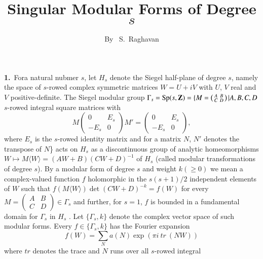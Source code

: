 \title{Singular Modular Forms of Degree $s$}\label{art02}

\author{By~ S.~Raghavan}

\date{}
\maketitle

\setcounter{page}{307}
\setcounter{pageoriginal}{262}
{\bf 1.}~For\pageoriginale a natural nubmer $s$, let $H_{s}$ denote
the Siegel half-plane of degree $s$, namely the space of $s$-rowed
complex symmetric matrices $W=U+iV$ with $U$, $V$ real and $V$
positive-definite. The Siegel modular group
$
\Gamma_{s}=\operatorname{Sp}(s,\mathbf{Z})=\{M=\left(\begin{smallmatrix} A & B\\ C &
D\end{smallmatrix}\right)|A,B,C,D$ $s$-rowed integral square matrices with 
$$
M
\left(
\begin{array}{cc}
0 & E_s\\
-E_s & 0
\end{array}
\right)
M'
=
\left(
\begin{array}{cc}
0 & E_s\\
-E_s & 0
\end{array}
\right),
$$
where $E_s$ is the $s$-rowed identity matrix and for a
matrix $N$, $N'$ denotes the transpose of $N$\} acts on $H_{s}$ as a
discontinuous group of analytic homeomorphisms $W\mapsto M\langle
W\rangle =(AW+B)(CW+D)^{-1}$ of $H_{s}$ (called modular
transformations of degree $s$). By a modular form of degree $s$ and
weight $k(\geq 0)$ we mean a complex-valued function $f$ holomorphic
in the $s(s+1)/2$ independent elements of $W$ such that $f(M\langle
W\rangle )\det(CW+D)^{-k}=f(W)$ for every $M=\left(\begin{smallmatrix}
A & B\\ C & D\end{smallmatrix}\right)\in \Gamma_{s}$ and further, for
$s=1$, $f$ is bounded in a fundamental domain for $\Gamma_{s}$ in
$H_{s}$ \cite{art02-key6}. Let $\{\Gamma_{s},k\}$ denote the complex
vector space of such modular forms. Every $f\in \{\Gamma_{s},k\}$ has
the Fourier expansion
\begin{equation*}
f(W)=\sum_{N}a(N)\exp (\pi i \ tr \ (NW))\tag{1}\label{art02-addeq1}
\end{equation*}
where $tr$ denotes the trace and $N$ runs over all $s$-rowed integral
